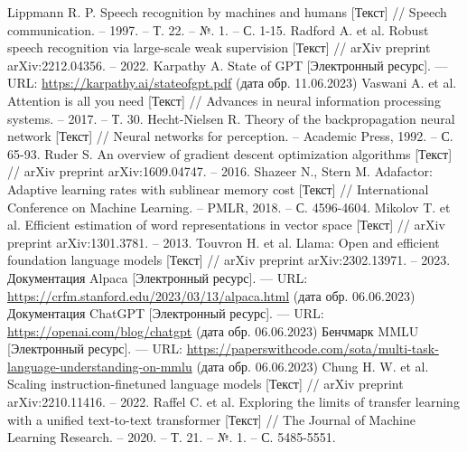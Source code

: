 \begin{thebibliography}{99}
  Lippmann R. P. Speech recognition by machines and humans [Текст] // Speech communication. – 1997. – Т. 22. – №. 1. – С. 1-15.
  Radford A. et al. Robust speech recognition via large-scale weak supervision [Текст] // arXiv preprint arXiv:2212.04356. – 2022.
  Karpathy A. State of GPT [Электронный ресурс]. --- URL: \url{https://karpathy.ai/stateofgpt.pdf} (дата обр. 11.06.2023)
  Vaswani A. et al. Attention is all you need [Текст] // Advances in neural information processing systems. – 2017. – Т. 30.
  Hecht-Nielsen R. Theory of the backpropagation neural network [Текст] // Neural networks for perception. – Academic Press, 1992. – С. 65-93.
  Ruder S. An overview of gradient descent optimization algorithms [Текст] // arXiv preprint arXiv:1609.04747. – 2016.
  Shazeer N., Stern M. Adafactor: Adaptive learning rates with sublinear memory cost [Текст] // International Conference on Machine Learning. – PMLR, 2018. – С. 4596-4604.
  Mikolov T. et al. Efficient estimation of word representations in vector space [Текст] // arXiv preprint arXiv:1301.3781. – 2013.
  Touvron H. et al. Llama: Open and efficient foundation language models [Текст] // arXiv preprint arXiv:2302.13971. – 2023.
  Документация Alpaca [Электронный ресурс]. --- URL: \url{https://crfm.stanford.edu/2023/03/13/alpaca.html} (дата обр. 06.06.2023)
  Документация ChatGPT [Электронный ресурс]. --- URL: \url{https://openai.com/blog/chatgpt} (дата обр. 06.06.2023)
  Бенчмарк MMLU [Электронный ресурс]. --- URL: \url{https://paperswithcode.com/sota/multi-task-language-understanding-on-mmlu} (дата обр. 06.06.2023)
  Chung H. W. et al. Scaling instruction-finetuned language models [Текст] // arXiv preprint arXiv:2210.11416. – 2022.
  Raffel C. et al. Exploring the limits of transfer learning with a unified text-to-text transformer [Текст] // The Journal of Machine Learning Research. – 2020. – Т. 21. – №. 1. – С. 5485-5551.
\end{thebibliography}